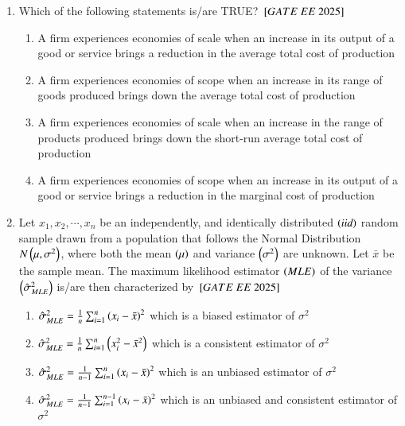 \documentclass[journal,12pt,onecolumn]{IEEEtran}
\theoremstyle{remark}
\begin{document}
\begin{enumerate}
\item Which of the following statements is/are TRUE?
$\sbrak{GATE\ EE\ 2025}$\\
    \begin{enumerate}[label=(\Alph*)]
    \item A firm experiences economies of scale when an increase in its output of a good or service brings a reduction in the average total cost of production
    \item A firm experiences economies of scope when an increase in its range of goods produced brings down the average total cost of production
    \item A firm experiences economies of scale when an increase in the range of products produced brings down the short-run average total cost of production
    \item A firm experiences economies of scope when an increase in its output of a good or service brings a reduction in the marginal cost of production
    \end{enumerate}
     
    \item Let $x_1, x_2, \cdots, x_n$ be an independently, and identically distributed  $\left(\textit{iid}\right)$ random sample drawn from a population that follows the Normal Distribution $N \left(\mu, \sigma^2\right)$, where both the mean $\left(\mu\right)$ and variance $ \left(\sigma^2\right)$ are unknown. Let $\bar{x}$ be the sample mean. The maximum likelihood estimator  $\left(MLE\right)$ of the variance $\left(\hat{\sigma}^2_{MLE}\right)$ is/are then characterized by
    $\sbrak{GATE\ EE\ 2025}$\\
    \begin{enumerate}[label=(\Alph*)]
    \item $\hat{\sigma}_{MLE}^2 = \frac{1}{n}\sum_{i=1}^{n} \left(x_i-\bar{x}\right)^2$ which is a biased estimator of $\sigma^2$
    \item $\hat{\sigma}_{MLE}^2 = \frac{1}{n}\sum_{i=1}^{n} \left(x_i^2-\bar{x}^2\right)$ which is a consistent estimator of $\sigma^2$
    \item $\hat{\sigma}_{MLE}^2 = \frac{1}{n-1}\sum_{i=1}^{n} \left(x_i-\bar{x}\right)^2$ which is an unbiased estimator of $\sigma^2$
    \item $\hat{\sigma}_{MLE}^2 = \frac{1}{n-1}\sum_{i=1}^{n-1} \left(x_i-\bar{x}\right)^2$ which is an unbiased and consistent estimator of $\sigma^2$
    \end{enumerate}
 

\end{enumerate}
\end{document}
